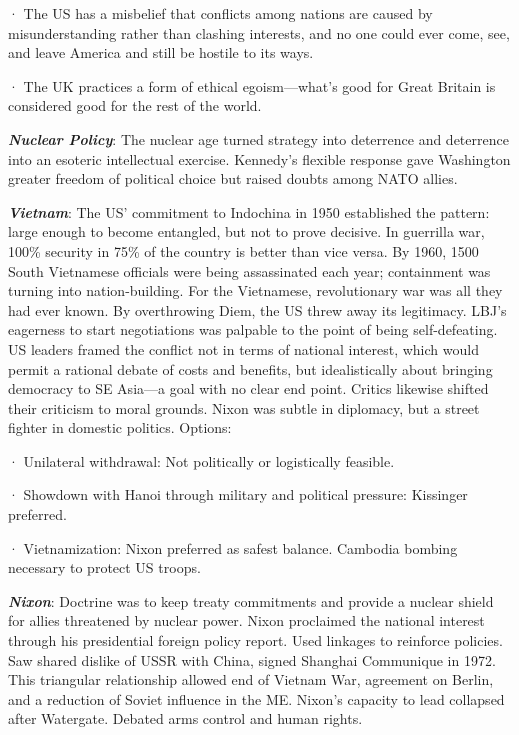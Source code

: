\documentclass[
]{article}
\begin{document}
· The US has a misbelief that conflicts among nations are caused by
misunderstanding rather than clashing interests, and no one could ever
come, see, and leave America and still be hostile to its ways.

· The UK practices a form of ethical egoism---what's good for Great
Britain is considered good for the rest of the world.

\textbf{\emph{Nuclear Policy}}: The nuclear age turned strategy into
deterrence and deterrence into an esoteric intellectual exercise.
Kennedy's flexible response gave Washington greater freedom of political
choice but raised doubts among NATO allies.

\textbf{\emph{Vietnam}}: The US' commitment to Indochina in 1950
established the pattern: large enough to become entangled, but not to
prove decisive. In guerrilla war, 100\% security in 75\% of the country
is better than vice versa. By 1960, 1500 South Vietnamese officials were
being assassinated each year; containment was turning into
nation-building. For the Vietnamese, revolutionary war was all they had
ever known. By overthrowing Diem, the US threw away its legitimacy.
LBJ's eagerness to start negotiations was palpable to the point of being
self-defeating. US leaders framed the conflict not in terms of national
interest, which would permit a rational debate of costs and benefits,
but idealistically about bringing democracy to SE Asia---a goal with no
clear end point. Critics likewise shifted their criticism to moral
grounds. Nixon was subtle in diplomacy, but a street fighter in domestic
politics. Options:

· Unilateral withdrawal: Not politically or logistically feasible.

· Showdown with Hanoi through military and political pressure: Kissinger
preferred.

· Vietnamization: Nixon preferred as safest balance. Cambodia bombing
necessary to protect US troops.

\textbf{\emph{Nixon}}: Doctrine was to keep treaty commitments and
provide a nuclear shield for allies threatened by nuclear power. Nixon
proclaimed the national interest through his presidential foreign policy
report. Used linkages to reinforce policies. Saw shared dislike of USSR
with China, signed Shanghai Communique in 1972. This triangular
relationship allowed end of Vietnam War, agreement on Berlin, and a
reduction of Soviet influence in the ME. Nixon's capacity to lead
collapsed after Watergate. Debated arms control and human rights.
\end{document}
